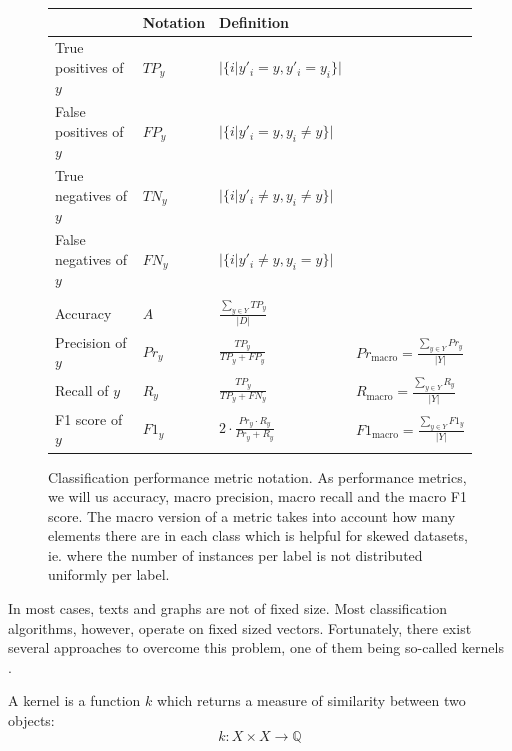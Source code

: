 \begin{figure}[htb!]
	\centering
	\renewcommand*{\arraystretch}{1.7}
	\begin{tabular}{llll}
		& Notation & Definition & \\
		\toprule
		True positives of $y$ &
		$TP_y$ &
		$\displaystyle |\{i | y'_i = y, y'_i = y_i \}|$ &
		\\
		False positives of $y$ &
		$FP_y$ &
		$\displaystyle |\{i | y'_i = y, y_i \neq y \}|$ &
		\\
		True negatives of $y$ &
		$TN_y$ &
		$\displaystyle |\{i | y'_i \neq y, y_i \neq y\}|$ &
		\\
		False negatives of $y$ &
		$FN_y$ &
		$\displaystyle |\{i | y'_i \neq y, y_i = y\}|$ &
		\\[1ex]
		\midrule{}%
		\\[-2ex]
		Accuracy &
		$A$ &
		$\displaystyle \frac{\sum\nolimits_{y \in Y} TP_y}{|D|}$ &
		\\[3ex]
		Precision of $y$ &
		$Pr_y$ &
		$\displaystyle \frac{TP_y}{TP_y + FP_y} $ &
		$Pr_{\text{macro}} = \displaystyle \frac{\sum\nolimits_{y \in Y} Pr_y}{|Y|}$
		\\[3ex]
		Recall of $y$ &
		$R_y$ &
		$\displaystyle \frac{TP_y}{TP_y + FN_y}$ &
		$R_{\text{macro}} = \displaystyle \frac{\sum\nolimits_{y \in Y} R_y}{|Y|}$
		\\[3ex]
		F1 score of $y$ &
		$F1_y$ &
		$\displaystyle 2 \cdot \frac{Pr_y \cdot R_y}{Pr_y + R_y}$ &
		$F1_{\text{macro}} = \displaystyle \frac{\sum\nolimits_{y \in Y} F1_y}{|Y|}$
		\\
	\end{tabular}
	\caption[Notation: Classification metrics]{Classification performance metric notation. As performance metrics, we will us accuracy, macro precision, macro recall and the macro F1 score. The macro version of a metric takes into account how many elements there are in each class which is helpful for skewed datasets, ie. where the number of instances per label is not distributed uniformly per label.}\label{fig:classification_metrics}
\end{figure}


In most cases, texts and graphs are not of fixed size.
Most classification algorithms, however, operate on fixed sized vectors.
Fortunately, there exist several approaches to overcome this problem, one of them being so-called kernels \cite{Kriege2012}\cite[p.~295]{Bishop2006}.

A kernel is a function $k$ which returns a measure of similarity between two objects:
\begin{equation*}
k: X \times X \rightarrow \mathbb{Q}
\end{equation*}

